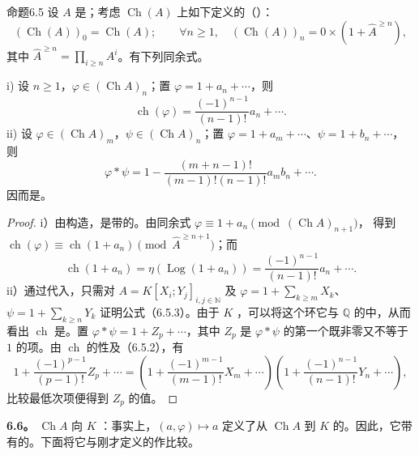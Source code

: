 \begin{SGAresult}{命题}{6.5}
设 $A$ 是；考虑 $\operatorname{Ch}(A)$ 上如下定义的（）：
\[
(\operatorname{Ch}(A))_0=\operatorname{Ch}(A);\qquad
\forall n\geqslant1,\quad
(\operatorname{Ch}(A))_n=0\times(1+\widehat A^{\geqslant n}),
\tag{6.5.1}
\]
其中 $\widehat A^{\geqslant n}=\prod_{i\geqslant n}A^i$。有下列同余式。

\textup{i)} 设 $n\geqslant1$，$\varphi\in(\operatorname{Ch}A)_n$；置 $\varphi=1+a_n+\cdots$，则
\[
\operatorname{ch}(\varphi)=\frac{(-1)^{n-1}}{(n-1)!}a_n+\cdots.
\tag{6.5.2}
\]
\textup{ii)} 设 $\varphi\in(\operatorname{Ch}A)_m$，$\psi\in(\operatorname{Ch}A)_n$；置 $\varphi=1+a_m+\cdots$、$\psi=1+b_n+\cdots$，则
\[
\varphi*\psi
 =1-\frac{(m+n-1)!}{(m-1)!(n-1)!}a_mb_n+\cdots.
\tag{6.5.3}
\]
因而是。
\end{SGAresult}
\begin{proof}
i）由构造，是带的。由同余式
$\varphi\equiv1+a_n\pmod{(\operatorname{Ch}A)_{n+1}}$，
得到
$\operatorname{ch}(\varphi)\equiv\operatorname{ch}(1+a_n)\pmod{\widehat A^{\geqslant n+1}}$；而
\[
\operatorname{ch}(1+a_n)=\eta(\operatorname{Log}(1+a_n))
 =\frac{(-1)^{n-1}}{(n-1)!}a_n+\cdots.
\]
ii）通过代入，只需对 $A=K[X_i;Y_j]_{i,j\in\mathbb N}$ 及
$\varphi=1+\sum_{k\geqslant m}X_k$、$\psi=1+\sum_{k\geqslant n}Y_k$ 证明公式（6.5.3）。由于 $K$ ，可以将这个环它与 $\mathbb Q$ 的中，从而看出 $\operatorname{ch}$ 是。置 $\varphi*\psi=1+Z_p+\cdots$，其中 $Z_p$ 是 $\varphi*\psi$ 的第一个既非零又不等于 $1$ 的项。由 $\operatorname{ch}$ 的性及（6.5.2），有
\[
1+\frac{(-1)^{p-1}}{(p-1)!}Z_p+\cdots
 =\left(1+\frac{(-1)^{m-1}}{(m-1)!}X_m+\cdots\right)
  \left(1+\frac{(-1)^{n-1}}{(n-1)!}Y_n+\cdots\right),
\]
比较最低次项便得到 $Z_p$ 的值。
\end{proof}

\textbf{6.6。}  $\operatorname{Ch}A$ 向 $K$ ：事实上，$(a,\varphi)\longmapsto a$ 定义了从 $\operatorname{Ch}A$ 到 $K$ 的。因此，它带有的。下面将它与刚才定义的作比较。

